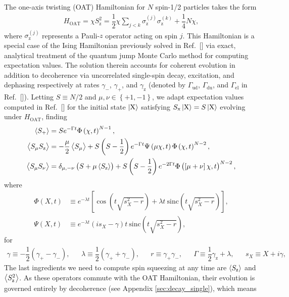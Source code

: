 \documentclass[aps,11pt,notitlepage,nofootinbib,longbibliography]{revtex4-1}
\renewcommand{\t}{\text} %
\newcommand{\f}[2]{\dfrac{#1}{#2}} %
\newcommand{\p}[1]{\left(#1\right)} %
\renewcommand{\sp}[1]{\left[#1\right]} %
\renewcommand{\set}[1]{\left\{#1\right\}} %
\newcommand{\bk}{\Braket} %
\newcommand{\z}{\text{z}}
\newcommand{\x}{\text{x}}
\newcommand{\X}{\text{X}}
\newcommand{\1}{\mathds{1}}
\begin{document}
The one-axis twisting (OAT) Hamiltonian for $N$ spin-1/2 particles
takes the form
\begin{align}
  H_{\t{OAT}}
  = \chi S_\z^2
  = \f12 \chi \sum_{j<k} \sigma_\z^{(j)} \sigma_\z^{(k)} + \f14 N \chi,
\end{align}
where $\sigma_\z^{(j)}$ represents a Pauli-$z$ operator acting on spin
$j$.  This Hamiltonian is a special case of the Ising Hamiltonian
previously solved in Ref.~[] via
exact, analytical treatment of the quantum jump Monte Carlo method for
computing expectation values.  The solution therein accounts for
coherent evolution in addition to decoherence via uncorrelated
single-spin decay, excitation, and dephasing respectively at rates
$\gamma_-$, $\gamma_+$, and $\gamma_\z$ (denoted by $\Gamma_{\t{ud}}$,
$\Gamma_{\t{du}}$, and $\Gamma_{\t{el}}$ in
Ref.~[]).  Letting $S\equiv N/2$
and $\mu,\nu\in\set{+1,-1}$, we adapt expectation values computed in
Ref.~[] for the initial state
$\ket{\X}$ satisfying $S_\x\ket{\X}=S\ket{\X}$ evolving under
$H_{\t{OAT}}$, finding
\begin{align}
  \bk{S_+}
  &= S e^{-\Gamma t} \Phi\p{\chi,t}^{N-1}, \label{eq:S+_OAT} \\
  \bk{S_\mu S_\z}
  &= -\f{\mu}{2}\bk{S_\mu} + S \p{S-\f12} e^{-\Gamma t}
  \Psi\p{\mu\chi,t} \Phi\p{\chi,t}^{N-2}, \\
  \bk{S_\mu S_\nu}
  &= \delta_{\mu,-\nu} \p{S + \mu\bk{S_\z}}
  + S \p{S-\f12} e^{-2\Gamma t}
  \Phi\p{\sp{\mu+\nu}\chi,t}^{N-2}, \label{eq:SS+-_OAT}
\end{align}
where
\begin{align}
  \Phi\p{X,t}
  &\equiv e^{-\lambda t} \sp{\cos\p{t\sqrt{s_X^2-r}}
    + \lambda t~\t{sinc}\p{t\sqrt{s_X^2-r}}},
  \\
  \Psi\p{X,t}
  &\equiv e^{-\lambda t} \p{is_X-\gamma}t~
  \t{sinc}\p{t\sqrt{s_X^2-r}},
\end{align}
for
\begin{align}
  \gamma \equiv -\f12 \p{\gamma_+ - \gamma_-},
  &&
  \lambda \equiv \f12 \p{\gamma_+ + \gamma_-},
  &&
  r \equiv \gamma_+ \gamma_-,
  &&
  \Gamma \equiv \f12\gamma_\z + \lambda,
  &&
  s_X \equiv X + i\gamma,
\end{align}
The last ingredients we need to compute spin squeezing at any time are
$\bk{S_\z}$ and $\bk{S_\z^2}$.  As these operators commute with the
OAT Hamiltonian, their evolution is governed entirely by decoherence
(see Appendix \ref{sec:decay_single}), which means
\end{document}
